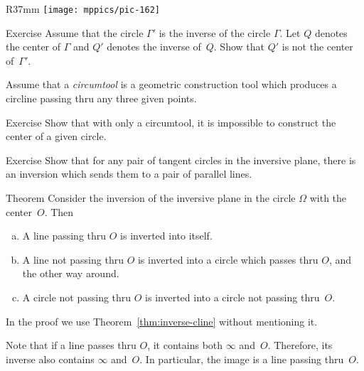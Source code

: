 \begin{wrapfigure}[7]{R}{37mm}
\vskip-0mm
\centering
\texttt{[image: mppics/pic-162]}
\end{wrapfigure}

\begin{thm}{Exercise}\label{ex:inv-center not=center-inv}
Assume that the circle $\Gamma'$ is the inverse of the circle $\Gamma$.
Let $Q$ denotes the center of $\Gamma$ and $Q'$ denotes the inverse of~$Q$.
Show that $Q'$ is not the center of~$\Gamma'$.
\end{thm}



Assume that a {}\emph{circumtool} is a geometric construction tool 
which produces a circline passing thru any three given points.

\begin{thm}{Exercise}\label{ex:circumtool}
Show that with only a circumtool,
it is impossible to construct the center of a given circle.
\end{thm}

\begin{thm}{Exercise}\label{ex:tangent-circ->parallels}
Show that for any pair of tangent circles in the inversive plane, there is an inversion which sends them to a pair of parallel lines.
\end{thm}

\begin{thm}{Theorem}\label{thm:inverse}
Consider the inversion of the inversive plane 
in the circle $\Omega$ with the center~$O$. 
Then 
\begin{enumerate}[(a)]
\item\label{thm:inverse:line-line}
A line passing thru $O$ is inverted into itself.
\item\label{thm:inverse:line} 
A line not passing thru $O$ is inverted into a circle which passes thru $O$, and the other way around.
\item\label{thm:inverse:circle} 
A circle not passing thru $O$ 
is inverted into a circle not passing thru~$O$. 
\end{enumerate}
\end{thm}

In the proof we use Theorem~\ref{thm:inverse-cline} without mentioning it.

Note that if a line passes thru $O$, it contains both $\infty$ and~$O$.
Therefore, its inverse also contains $\infty$ and~$O$.
In particular, the image is a line passing thru~$O$.


